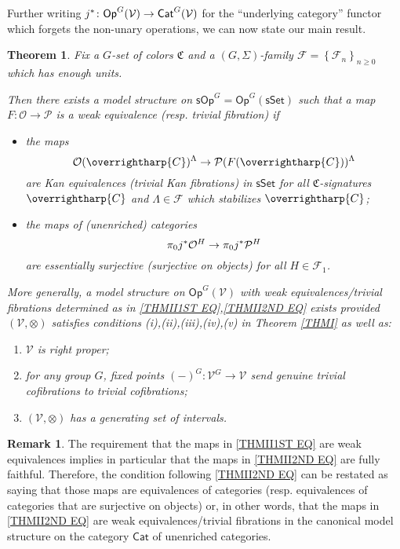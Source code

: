 \documentclass[a4paper,10pt
,draft
]{article}%
\numberwithin{equation}{section}
\numberwithin{figure}{section}
\newtheorem{theorem}[equation]{Theorem}%
\theoremstyle{definition} %
\newtheorem{remark}[equation]{Remark}%
\newcommand{\set}[1]{\left\{#1\right\}}%
\newcommand{\vect}[1]{\text{\overrightharp{\ensuremath{#1}}}}
\newcommand{\Op}{\mathsf{Op}}%
\newcommand{\F}{\ensuremath{\mathcal F}}
\newcommand{\V}{\ensuremath{\mathcal V}}
\renewcommand{\O}{\ensuremath{\mathcal O}}
\newcommand{\1}{\ensuremath{\mathbbm 1}}%
\begin{document}
Further writing 
$j^{\**} \colon 
\mathsf{Op}^G(\V) \to \mathsf{Cat}^G(\V)$
for the ``underlying category''
functor which forgets the non-unary operations, 
we can now state our main result.



\begin{theorem}\label{THMII}
Fix a $G$-set of colors $\mathfrak{C}$
and a $(G,\Sigma)$-family $\F = \set{\F_n}_{n \geq 0}$
which has enough units.

Then there exists a model structure on
$\mathsf{sOp}^G = 
\mathsf{Op}^G(\mathsf{sSet})$
such that a map
$F\colon \mathcal{O} \to \mathcal{P}$
is a weak equivalence (resp. trivial fibration) if
\begin{itemize}
\item the maps
\begin{equation}\label{THMII1ST EQ}
	\O(\vect{C})^{\Lambda} \to \mathcal{P}(F(\vect{C}))^{\Lambda}
\end{equation}
are Kan equivalences (trivial Kan fibrations)
in $\mathsf{sSet}$
for all $\mathfrak{C}$-signatures $\vect{C}$
and $\Lambda \in \F$ which stabilizes $\vect{C}$;
\item 
the maps of (unenriched) categories
\begin{equation}\label{THMII2ND EQ}
\pi_0 j^{\**} \O^H 
\to 
\pi_0 j^{\**} \mathcal{P}^H 
\end{equation}
are essentially surjective (surjective on objects)
for all $H \in \F_1$.
\end{itemize}
More generally, a model structure on 
$\Op^G(\V)$
with weak equivalences/trivial fibrations determined as in 
\eqref{THMII1ST EQ},\eqref{THMII2ND EQ}
exists provided $(\V,\otimes)$ satisfies conditions
(i),(ii),(iii),(iv),(v) in Theorem \ref{THMI}
as well as:
\begin{enumerate}
	\item[(vi)] $\V$ is right proper;
	\item[(vii)]
	for any group $G$, fixed points
	$(-)^{G} \colon \V^G \to \V$
	send genuine trivial cofibrations to trivial cofibrations;
	\item[(viii)] $(\V, \otimes)$ has a generating set of intervals.
\end{enumerate}
\end{theorem}





\begin{remark}\label{WETRFCAN REM}
The requirement that the maps in 
\eqref{THMII1ST EQ}
are weak equivalences implies in particular that the maps in
\eqref{THMII2ND EQ}
are fully faithful.
Therefore, the condition following \eqref{THMII2ND EQ}
can be restated as saying that those maps are
equivalences of categories (resp. equivalences of categories that are surjective on objects) or, in other words,
that the maps in \eqref{THMII2ND EQ}
are weak equivalences/trivial fibrations in the canonical model structure on the category $\mathsf{Cat}$ of unenriched categories.
\end{remark}
\end{document}
